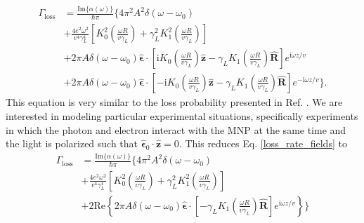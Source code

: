 \documentclass [11pt, proquest] {uwthesis}[2016/11/22]
\begin{document}
\begin{equation}
\begin{aligned}
\Gamma_{\textrm{loss}} &= \frac{\textrm{Im}\{\alpha(\omega)\}}{\hbar\pi}\Big\{4\pi^2A^2\delta(\omega-\omega_0)\\
&+ \frac{4e^2\omega^2}{v^4\gamma_L^4}\left[K_0^2\left(\frac{\omega R}{v\gamma_L}\right) + \gamma_L^2 K_1^2\left(\frac{\omega R}{v\gamma_L}\right)\right]\\
&+ 2\pi A\delta(\omega-\omega_0)\hat{\boldsymbol{\epsilon}}\cdot\left[ \textrm{i}K_0\left( \frac{\omega R}{v\gamma_L} \right)\hat{\textbf{z}} - \gamma_L K_1\left( \frac{\omega R}{v\gamma_L} \right)\hat{\textbf{R}}\right]e^{\textrm{i}\omega z/v}\\
&+ 2\pi A\delta(\omega-\omega_0)\hat{\boldsymbol{\epsilon}}\cdot\left[ -\textrm{i}K_0\left( \frac{\omega R}{v\gamma_L} \right)\hat{\textbf{z}} - \gamma_L K_1\left( \frac{\omega R}{v\gamma_L} \right)\hat{\textbf{R}}\right]e^{-\textrm{i}\omega z/v} \Big\}.
\label{loss_rate_fields}
\end{aligned}
\end{equation}
This equation is very similar to the loss probability presented in Ref. \cite{vanAiken}. We are interested in modeling particular experimental situations, specifically experiments in which the photon and electron interact with the MNP at the same time and the light is polarized such that $\hat{\boldsymbol{\epsilon}}_0 \cdot \hat{\textbf{z}} = 0$. This reduces Eq. \ref{loss_rate_fields} to
\begin{equation}
\begin{aligned}
\Gamma_{\textrm{loss}} &= \frac{\textrm{Im}\{\alpha(\omega)\}}{\hbar\pi}\Big\{4\pi^2A^2\delta(\omega-\omega_0)\\
&+ \frac{4e^2\omega^2}{v^4\gamma_L^4}\left[K_0^2\left(\frac{\omega R}{v\gamma_L}\right) + \gamma_L^2 K_1^2\left(\frac{\omega R}{v\gamma_L}\right)\right]\\
&+ 2\textrm{Re}\left\{2\pi A\delta(\omega-\omega_0)\hat{\boldsymbol{\epsilon}}\cdot\left[ -\gamma_L K_1\left( \frac{\omega R}{v\gamma_L} \right)\hat{\textbf{R}}\right]e^{\textrm{i}\omega z/v}\right\}\Big\}
\label{loss_fields_realpart}
\end{aligned}
\end{equation}
\end{document}
